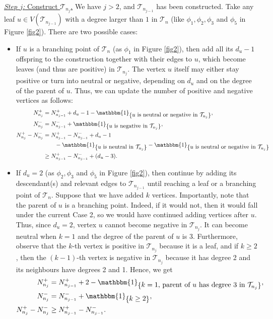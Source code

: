 \documentclass[11pt]{article}
\numberwithin{equation}{section}
\theoremstyle{plain}
\newcommand{\Tt}{\mathcal{T}}
\newcommand{\ind}[1]{\mathbbm{1}_{\left\{#1\right\}}}
\begin{document}
\medskip\noindent
\underline{\textit{Step $j$:} Construct $\mathcal{T}_{n_{j}}$.} We have $j>2$, and $\mathcal{T}_{n_{j-1}}$ has been constructed. Take any leaf $u\in V(\mathcal{T}_{n_{j-1}})$ with a degree larger than $1$ in $\mathcal{T}_n$ (like $\phi_1, \phi_2, \phi_3$ and $\phi_5$ in Figure \ref{fig2}).  There are two possible cases:
\begin{itemize}
\item[{\bf Case 1.}] If $u$ is a branching point of $\mathcal{T}_n$ (as $\phi_1$ in Figure \ref{fig2}), then add all its $d_u-1$ offspring to the construction together with their edges to $u$, which become leaves (and thus are positive) in $\Tt_{n_j}$. The vertex $u$ itself may either stay positive or turn into neutral or negative, depending on $d_u$ and on the degree of the parent of $u$. Thus, we can update the number of positive and negative vertices as follows:  
\begin{align*}
N_{n_j}^+ &= N_{n_{j-1}}^+ + d_u - 1 - \ind{\mbox{$u$ is neutral or negative in $\Tt_{n_j}$}},\\
N_{n_j}^- &= N_{n_{j-1}}^-+ \ind{\mbox{$u$ is negative in $\Tt_{n_j}$}},\\
N_{n_j}^+ - N_{n_j}^- &= N_{n_{j-1}}^+ - N_{n_{j-1}}^- + d_u - 1\\ 
&\qquad - \ind{\mbox{$u$ is neutral in $\Tt_{n_j}$}} - \ind{\mbox{$u$ is neutral or negative in $\Tt_{n_j}$}}\\ 
& \ge N_{n_{j-1}}^+ - N_{n_{j-1}}^- + (d_u-3).
\end{align*}
\item[{\bf Case 2.}] If $d_u=2$  (as $\phi_2,\phi_3$ and $\phi_5$ in Figure \ref{fig2}), then continue by adding its descendant(s) and relevant edges to $\Tt_{n_{j-1}}$ until reaching a leaf or a branching point of $\Tt_n$. Suppose that we have added $k$ vertices. Importantly, note that the parent of $u$ is a branching point. Indeed, if it would not, then it would fall under the current Case 2, so we would have continued adding vertices after $u$. Thus, since $d_u=2$, vertex $u$ cannot become negative in $\Tt_{n_j}$. It can become neutral when $k=1$ and the degree of the parent of $u$ is $3$. Furthermore, observe that the $k$-th vertex is positive in $\Tt_{n_j}$ because it is a leaf, and if $k \geq 2$, then the $(k-1)$-th vertex is negative in $\Tt_{n_j}$ because it has degree 2 and its neighbours have degrees 2 and 1. Hence, we get
\begin{align*}
N_{n_j}^+ &= N_{n_{j-1}}^+ + 2 - \ind{\mbox{$k=1$, parent of $u$ has degree 3 in $\Tt_{n_j}$}},\\
N_{n_j}^- &= N_{n_{j-1}}^- + \ind{\mbox{$k\ge 2$}},\\
N_{n_j}^+ - N_{n_j}^- &\geq  N_{n_{j-1}}^+ - N_{n_{j-1}}^-.
\end{align*}
\end{itemize}
\end{document}
